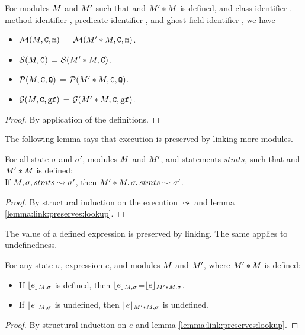 {
\begin{lemma}
\label{lemma:link:preserves:lookup}
For   modules $M$ and $M'$ such that and $M'*M$ is defined, and class identifier . method identifier , predicate identifier , and ghost field identifier , we have

\begin{itemize}
\item
 ${\cal M}( M,{\textrm{\ttfamily{C}}},{\textrm{\ttfamily{m}}}) $ =  ${\cal M}( M'*M,{\textrm{\ttfamily{C}}},{\textrm{\ttfamily{m}}})$.
\item
 ${\cal S}( M,{\textrm{\ttfamily{C}}})$  =  ${\cal S}( M'*M,{\textrm{\ttfamily{C}}})$.
\item
 ${\cal P}( M,{\textrm{\ttfamily{C}}},{\textrm{\ttfamily{Q}}}) $ =  ${\cal P}( M'*M,{\textrm{\ttfamily{C}}},{\textrm{\ttfamily{Q}}})$.
\item
${\cal G}( M,{\textrm{\ttfamily{C}}},{\textrm{\ttfamily{gf}}}) $ =  ${\cal G}( M'*M,{\textrm{\ttfamily{C}}},{\textrm{\ttfamily{gf}}})$.
\end{itemize}
\end{lemma}
}
{\begin{proof} By application of the definitions.
\end{proof}
}



The following lemma says that execution is preserved by linking more modules.

{
\begin{lemma}
\label{lemma:link:preserves:execution}
For all state $\sigma$ and $\sigma'$, modules $M$ and $M'$, and statements $stmts$, such that and $M'*M$ is defined:
\\
If $M, \sigma, stmts \leadsto \sigma'$, then $M'*M, \sigma, stmts \leadsto \sigma'$.
\end{lemma}
}
{\begin{proof} By structural induction on the execution $\leadsto$ and lemma \ref{lemma:link:preserves:lookup}.
\end{proof}
}

{The value of a defined expression is preserved by linking. The same applies to undefinedness.}

{\begin{lemma}
\label{lemma:link:preserves:exprs}
For any   state $\sigma$, expression $e$, and modules $M$ and $M'$, where $M'*M$ is defined:\\
\begin{itemize}
\item
If  ${\lfloor{ {e}}\rfloor_{M,\sigma}}$ is defined,  then ${\lfloor{ {e}}\rfloor_{M,\sigma}}$=${\lfloor{ {e}}\rfloor_{M'*M,\sigma}}$.
\item
{If  ${\lfloor{ {e}}\rfloor_{M,\sigma}}$ is undefined,  then ${\lfloor{ {e}}\rfloor_{M'*M,\sigma}}$ is undefined.}
\end{itemize}
\end{lemma}

\begin{proof}
By structural induction on $e$ and   lemma \ref{lemma:link:preserves:lookup}.
\end{proof}
}

